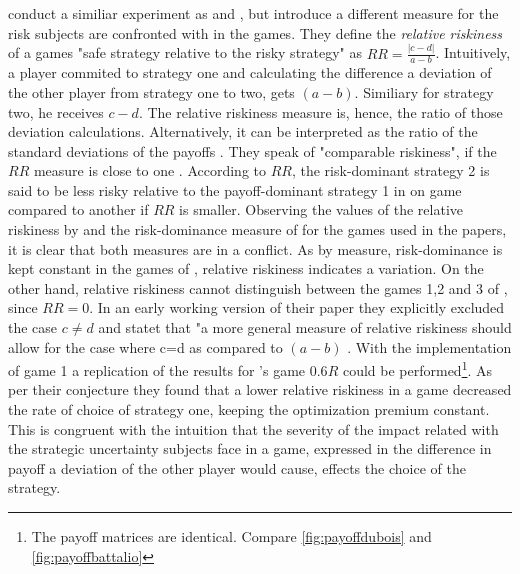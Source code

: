 \documentclass[11pt]{article}
\begin{document}
\textcite{dubois_optimization_2012} conduct a similiar experiment as 
\textcite{schmidt_playing_2003} and \textcite{battalio_optimization_2001},
but introduce a different measure for the risk subjects are confronted with in
the games. They define the \textit{relative riskiness} of a games 
"safe strategy relative to the risky strategy" as $RR = \frac{|c-d|}{a-b}$.
Intuitively, a player commited to strategy one and calculating the 
difference a deviation of the other player from strategy one to two, gets
$(a-b)$. Similiary for strategy two, he receives $c-d$. The relative riskiness
measure is, hence, the ratio of those deviation calculations. Alternatively,
it can be interpreted as the ratio of the standard deviations of the payoffs 
\parencite{dubois_optimization_2012}. They speak of "comparable riskiness",
if the $RR$ measure is close to one \cite{dubois_optimization_2012}. 
According to $RR$, the risk-dominant strategy 2 is said to be less risky 
relative to the payoff-dominant strategy 1 in on game compared to another if 
$RR$ is smaller.
Observing the values of the relative riskiness by 
\textcite{dubois_optimization_2012} and the risk-dominance measure of 
\textcite{schmidt_playing_2003} for the games used in the papers, it is clear
that both measures are in a conflict. As by \textcite{schmidt_playing_2003}
measure, risk-dominance is kept constant in the games of 
\textcite{battalio_optimization_2001}, relative riskiness indicates a 
variation. On the other hand, relative riskiness cannot distinguish between
the games 1,2 and 3 of \textcite{schmidt_playing_2003}, since $RR=0$. In an
early working version of their paper they explicitly excluded the case 
$c \neq d$ and statet that "a more general measure of relative riskiness 
should allow for the case where c=d as compared to $(a-b)$ 
\parencite{dubois_optimization_2008_working}. 
With the implementation of game 1 a replication of the results for 
\textcite{battalio_optimization_2001}'s game $0.6R$ could be 
performed\footnote{The payoff matrices are identical. 
Compare \ref{fig:payoffdubois} and \ref{fig:payoffbattalio}}. 
As per their conjecture they found that a lower relative riskiness in a game 
decreased the rate of choice of strategy one, keeping the optimization premium 
constant. This is congruent with the intuition that the severity of the impact 
related with the strategic uncertainty subjects face in a game, expressed in
the difference in payoff a deviation of the other player would cause,
effects the choice of the strategy. 
\end{document}
